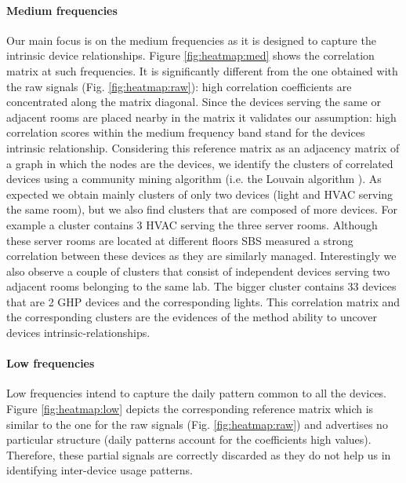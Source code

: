 \paragraph{Medium frequencies}
Our main focus is on the medium frequencies as it is designed to capture the intrinsic device relationships.
Figure \ref{fig:heatmap:med} shows the correlation matrix at such frequencies.
It is significantly different from the one obtained with the raw signals (Fig. \ref{fig:heatmap:raw}): high correlation coefficients are concentrated along the matrix diagonal. 
Since the devices serving the same or adjacent rooms are placed nearby in the matrix it validates our assumption: high correlation scores within the medium frequency band stand for the devices intrinsic relationship.
Considering this reference matrix as an adjacency matrix of a graph in which the nodes are the devices, we identify the clusters of correlated devices using a community mining algorithm (i.e. the Louvain algorithm \cite{blondel:unfolding}).
As expected we obtain mainly clusters of only two devices (light and HVAC serving the same room), but we also find clusters that are composed of more devices.
For example a cluster contains 3 HVAC serving the three server rooms. Although these server rooms are located at different floors SBS measured a strong correlation between these devices as they are similarly managed.
Interestingly we also observe a couple of clusters that consist of independent devices serving two adjacent rooms belonging to the same lab.
The bigger cluster contains 33 devices that are 2 GHP devices and the corresponding lights.
This correlation matrix and the corresponding clusters are the evidences of the method ability to uncover devices intrinsic-relationships.
 
\paragraph{Low frequencies}
Low frequencies intend to capture the daily pattern common to all the devices.
Figure \ref{fig:heatmap:low} depicts the corresponding reference matrix which is similar to the one for the raw signals (Fig. \ref{fig:heatmap:raw}) and advertises no particular structure (daily patterns account for the coefficients high values).
Therefore, these partial signals are correctly discarded as they do not help us in identifying inter-device usage patterns.
 
